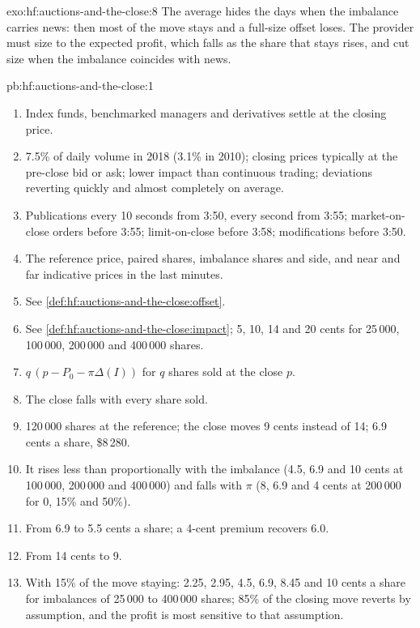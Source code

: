 \begin{solution}{exo:hf:auctions-and-the-close:8}
The average hides the days when the imbalance carries news: then most of the move stays and a full-size offset loses. The provider must size to
the expected profit, which falls as the share that stays rises, and cut size when the imbalance coincides with news.
\end{solution}

\begin{solution}{pb:hf:auctions-and-the-close:1}
\begin{enumerate}
\item Index funds, benchmarked managers and derivatives settle at the closing price.
\item 7.5\% of daily volume in 2018 (3.1\% in 2010); closing prices typically at the pre-close bid or ask; lower impact than continuous trading;
deviations reverting quickly and almost completely on average.
\item Publications every 10 seconds from 3:50, every second from 3:55; market-on-close orders before 3:55; limit-on-close before 3:58;
modifications before 3:50.
\item The reference price, paired shares, imbalance shares and side, and near and far indicative prices in the last minutes.
\item See \cref{def:hf:auctions-and-the-close:offset}.
\item See \cref{def:hf:auctions-and-the-close:impact}; 5, 10, 14 and 20 cents for 25\,000, 100\,000, 200\,000 and 400\,000 shares.
\item $q\,(p-P_0-\pi\Delta(I))$ for $q$ shares sold at the close $p$.
\item The close falls with every share sold.
\item 120\,000 shares at the reference; the close moves 9 cents instead of 14; 6.9 cents a share, \$8\,280.
\item It rises less than proportionally with the imbalance (4.5, 6.9 and 10 cents at 100\,000, 200\,000 and 400\,000) and falls with $\pi$ (8, 6.9 and 4
cents at 200\,000 for 0, 15\% and 50\%).
\item From 6.9 to 5.5 cents a share; a 4-cent premium recovers 6.0.
\item From 14 cents to 9.
\item With 15\% of the move staying: 2.25, 2.95, 4.5, 6.9, 8.45 and 10 cents a share for imbalances of 25\,000 to 400\,000 shares; 85\% of the
closing move reverts by assumption, and the profit is most sensitive to that assumption.

\end{enumerate}
\end{solution}
